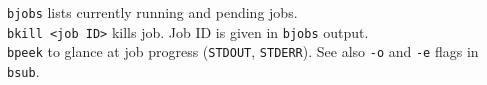 \documentclass[]{book}
\begin{document}
\texttt{bjobs} lists currently running and pending jobs.\\
\texttt{bkill\ \textless{}job\ ID\textgreater{}} kills job. Job ID is
given in \texttt{bjobs} output.\\
\texttt{bpeek} to glance at job progress (\texttt{STDOUT},
\texttt{STDERR}). See also \texttt{-o} and \texttt{-e} flags in
\texttt{bsub}.


\end{document}
